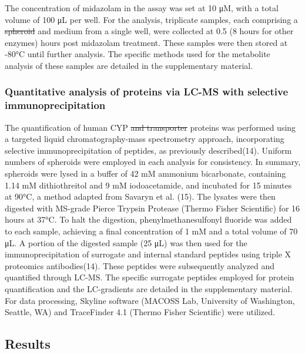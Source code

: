 \documentclass[
  letterpaper,
  DIV=11,
  numbers=noendperiod,
  oneside]{scrartcl}
\begin{document}
The concentration of midazolam in the assay was set at 10 μM, with a
total volume of 100 μL per well. For the analysis, triplicate samples,
each comprising a \st{spheroid} and medium from a single well, were
collected at 0.5 (8 hours for other enzymes) hours post midazolam
treatment. These samples were then stored at -80°C until further
analysis. The specific methods used for the metabolite analysis of these
samples are detailed in the supplementary material.

\subsubsection{Quantitative analysis of proteins via LC-MS with
selective
immunoprecipitation}\label{quantitative-analysis-of-proteins-via-lc-ms-with-selective-immunoprecipitation}

The quantification of human CYP \st{and transporter} proteins was
performed using a targeted liquid chromatography-mass spectrometry
approach, incorporating selective immunoprecipitation of peptides, as
previously described(14). Uniform numbers of spheroids were employed in
each analysis for consistency. In summary, spheroids were lysed in a
buffer of 42 mM ammonium bicarbonate, containing 1.14 mM dithiothreitol
and 9 mM iodoacetamide, and incubated for 15 minutes at 90°C, a method
adapted from Savaryn et al. (15). The lysates were then digested with
MS-grade Pierce Trypsin Protease (Thermo Fisher Scientific) for 16 hours
at 37°C. To halt the digestion, phenylmethanesulfonyl fluoride was added
to each sample, achieving a final concentration of 1 mM and a total
volume of 70 μL. A portion of the digested sample (25 μL) was then used
for the immunoprecipitation of surrogate and internal standard peptides
using triple X proteomics antibodies(14). These peptides were
subsequently analyzed and quantified through LC-MS. The specific
surrogate peptides employed for protein quantification and the
LC-gradients are detailed in the supplementary material. For data
processing, Skyline software (MACOSS Lab, University of Washington,
Seattle, WA) and TraceFinder 4.1 (Thermo Fisher Scientific) were
utilized.

\subsection*{Results}\label{results}
\end{document}
